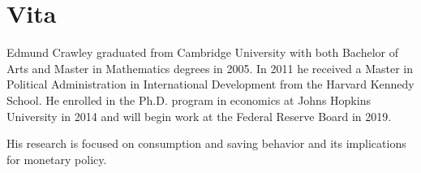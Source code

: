 \chapter*{Vita}

Edmund Crawley graduated from Cambridge University with both Bachelor of Arts and Master in Mathematics degrees in 2005. In 2011 he received a Master in Political Administration in International Development from the Harvard Kennedy School. He enrolled in the Ph.D. program in economics at Johns Hopkins University in 2014 and will begin work at the Federal Reserve Board in 2019.

His research is focused on consumption and saving behavior and its implications for monetary policy.